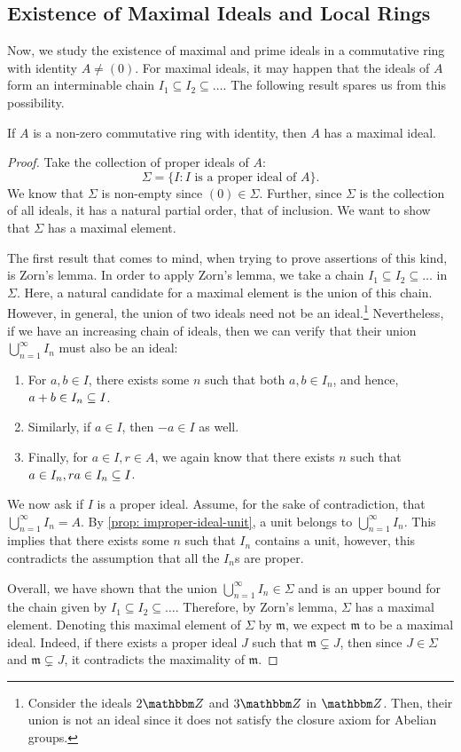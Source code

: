\subsection{Existence of Maximal Ideals and Local Rings}
Now, we study the existence of maximal and prime ideals in a commutative ring with identity $A \neq(0)$. For maximal ideals, it may happen that the ideals of $A$ form an interminable chain $I_{1} \subseteq I_{2} \subseteq \ldots$. The following result spares us from this possibility.
\begin{theorem}\label{thm: exist-maximal}
    If $A$ is a non-zero commutative ring with identity, then $A$ has a maximal ideal.
\end{theorem}
\begin{proof}
    Take the collection of proper ideals of $A$:
    \[\Sigma=\{I: I\text{ is a proper ideal of }A\}.\]
    We know that $\Sigma$ is non-empty since $(0) \in \Sigma$. Further, since $\Sigma$ is the collection of all ideals, it has a natural partial order, that of inclusion. We want to show that $\Sigma$ has a maximal element. 
    
    The first result that comes to mind, when trying to prove assertions of this kind, is Zorn's lemma. In order to apply Zorn's lemma, we take a chain $I_{1} \subseteq I_{2} \subseteq \ldots$ in $\Sigma$. Here, a natural candidate for a maximal element is the union of this chain. However, in general, the union of two ideals need not be an ideal.\footnote{ Consider the ideals $2 {\Z}$ and $3 {\Z}$ in ${\Z}$. Then, their union is not an ideal since it does not satisfy the closure axiom for Abelian groups.} Nevertheless, if we have an increasing chain of ideals, then we can verify that their union  $\bigcup_{n=1}^{\infty} I_{n}$ must also be an ideal:
    \begin{enumerate}
        \item For $a,b \in I$, there exists some $n$ such that both $a,b \in I_n$, and hence, $a+b \in I_n \ss I$. 
        \item Similarly, if $a\in I$, then $-a \in I$ as well.
        \item Finally, for $a \in I, r \in A$, we again know that there exists $n$ such that $a\in I_n, ra \in I_n \ss I$. 
    \end{enumerate}
    We now ask if $I$ is a proper ideal. Assume, for the sake of contradiction, that $\bigcup_{n=1}^{\infty} I_{n} = A$. By \cref{prop: improper-ideal-unit}, a unit belongs to $\bigcup_{n=1}^{\infty} I_{n}$. This implies that there exists some $n$ such that $I_n$ contains a unit, however, this contradicts the assumption that all the $I_n$s are proper.  
    
    Overall, we have shown that the union $\bigcup_{n=1}^{\infty} I_{n} \in \Sigma$ and is an upper bound for the chain given by $I_{1} \subseteq I_{2} \subseteq \ldots$. Therefore, by Zorn's lemma, $\Sigma$ has a maximal element. Denoting this maximal element of $\Sigma$ by $\mathfrak{m}$, we expect $\mathfrak{m}$ to be a maximal ideal. Indeed, if there exists a proper ideal $J$ such that $\mathfrak{m} \subsetneq J$, then since $J \in \Sigma$ and $\mathfrak{m} \subsetneq J$, it contradicts the maximality of $\mathfrak{m}$.
\end{proof}
